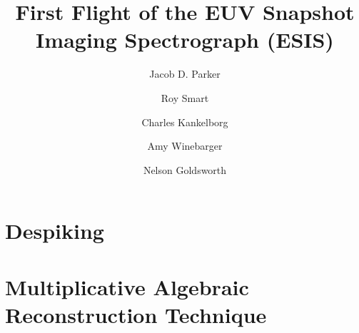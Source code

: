 \documentclass[preprint]{aastex63}
\begin{document}
	
	
	\title{First Flight of the EUV Snapshot Imaging Spectrograph (ESIS)}
	
	\author[0000-0001-8732-8284]{Jacob D. Parker}
	\author[0000-0002-9997-5515]{Roy Smart}
	\author[0000-0002-1992-7469]{Charles Kankelborg}
	\author[0000-0002-5608-531X]{Amy Winebarger}
	\author[0000-0002-6787-0380]{Nelson Goldsworth}
	
	\begin{abstract}
				
	\end{abstract} 
    
    
    \acknowledgements
    
   	
   	\appendix
   	\section{Despiking}\label{despike}
   	
   	\section{Multiplicative Algebraic Reconstruction Technique}\label{MART}
   	
	
	
	
\end{document}
